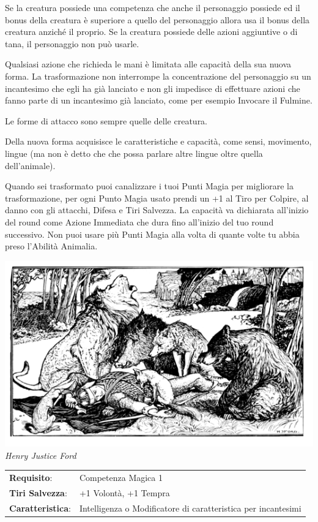 \begin{multicols}{2}
Se la creatura possiede una competenza che anche il personaggio possiede ed il bonus della creatura è superiore a quello del personaggio allora usa il bonus della creatura anziché il proprio. Se la creatura possiede delle azioni aggiuntive o di tana, il personaggio non può usarle.

Qualsiasi azione che richieda le mani è limitata alle capacità della sua nuova forma. La trasformazione non interrompe la concentrazione del personaggio su un incantesimo che egli ha già lanciato e non gli impedisce di effettuare azioni che fanno parte di un incantesimo già lanciato, come per esempio Invocare il Fulmine.

Le forme di attacco sono sempre quelle delle creatura.

Della nuova forma acquisisce le caratteristiche e capacità, come sensi, movimento, lingue (ma non è detto che che possa parlare altre lingue oltre quella dell'animale).

Quando sei trasformato puoi canalizzare i tuoi Punti Magia per migliorare la trasformazione, per ogni Punto Magia usato prendi un +1 al Tiro per Colpire, al danno con gli attacchi, Difesa e Tiri Salvezza. La capacità va dichiarata all'inizio del round come Azione Immediata che dura fino all'inizio del tuo round successivo. Non puoi usare più Punti Magia alla volta di quante volte tu abbia preso l'Abilità Animalia.

\begin{center}
\includegraphics[width=0.9\linewidth]{immagini/animalia3.png}
\emph{Henry Justice Ford}
\end{center}

\noindent\begin{tabularx}{\linewidth}{>{\raggedright\arraybackslash}p{2.5cm}X}
\rowcolor{gray!20}\textbf{Requisito}: & Competenza Magica 1\\
\textbf{Tiri Salvezza}: & +1 Volontà, +1 Tempra\\
\rowcolor{gray!20}\textbf{Caratteristica}: & Intelligenza o Modificatore di caratteristica per incantesimi\\
\end{tabularx}\smallskip


\end{multicols}
